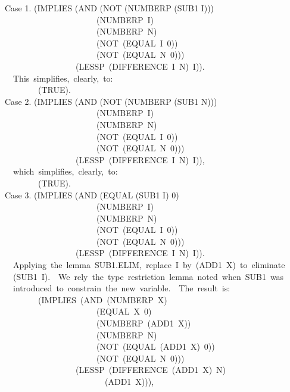 \documentclass[10pt]{book}
\newenvironment{pubasis}{\begin{flushleft}}{\end{flushleft}}
\begin{document}
\begin{pubasis}
Case 1.	(IMPLIES (AND (NOT (NUMBERP (SUB1 I)))\\
~~~~~~~~~~~~~~~~~~~~~~(NUMBERP~I)\\
~~~~~~~~~~~~~~~~~~~~~~(NUMBERP~N)\\
~~~~~~~~~~~~~~~~~~~~~~(NOT~(EQUAL~I~0))\\
~~~~~~~~~~~~~~~~~~~~~~(NOT~(EQUAL~N~0)))\\
~~~~~~~~~~~~~~~~~(LESSP~(DIFFERENCE~I~N)~I)).\\

~~This~simplifies,~clearly,~to:\\

~~~~~~~~(TRUE).\\

Case 2.	(IMPLIES (AND (NOT (NUMBERP (SUB1 N)))\\
~~~~~~~~~~~~~~~~~~~~~~(NUMBERP~I)\\
~~~~~~~~~~~~~~~~~~~~~~(NUMBERP~N)\\
~~~~~~~~~~~~~~~~~~~~~~(NOT~(EQUAL~I~0))\\
~~~~~~~~~~~~~~~~~~~~~~(NOT~(EQUAL~N~0)))\\
~~~~~~~~~~~~~~~~~(LESSP~(DIFFERENCE~I~N)~I)),\\

~~which~simplifies,~clearly,~to:\\

~~~~~~~~(TRUE).\\

Case 3.	(IMPLIES (AND (EQUAL (SUB1 I) 0)\\
~~~~~~~~~~~~~~~~~~~~~~(NUMBERP~I)\\
~~~~~~~~~~~~~~~~~~~~~~(NUMBERP~N)\\
~~~~~~~~~~~~~~~~~~~~~~(NOT~(EQUAL~I~0))\\
~~~~~~~~~~~~~~~~~~~~~~(NOT~(EQUAL~N~0)))\\
~~~~~~~~~~~~~~~~~(LESSP~(DIFFERENCE~I~N)~I)).\\

~~Applying~the~lemma~SUB1.ELIM,~replace~I~by~(ADD1~X)~to~eliminate\\
~~(SUB1~I).~~We~rely~the~type~restriction~lemma~noted~when~SUB1~was\\
~~introduced~to~constrain~the~new~variable.~~The~result~is:\\

~~~~~~~~(IMPLIES~(AND~(NUMBERP~X)\\
~~~~~~~~~~~~~~~~~~~~~~(EQUAL~X~0)\\
~~~~~~~~~~~~~~~~~~~~~~(NUMBERP~(ADD1~X))\\
~~~~~~~~~~~~~~~~~~~~~~(NUMBERP~N)\\
~~~~~~~~~~~~~~~~~~~~~~(NOT~(EQUAL~(ADD1~X)~0))\\
~~~~~~~~~~~~~~~~~~~~~~(NOT~(EQUAL~N~0)))\\
~~~~~~~~~~~~~~~~~(LESSP~(DIFFERENCE~(ADD1~X)~N)\\
~~~~~~~~~~~~~~~~~~~~~~~~(ADD1~X))),\\


\end{pubasis}
\end{document}
